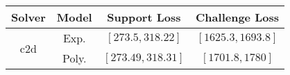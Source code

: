 \begin{tabular}{cc|c|c} 
\hline 
 Solver & Model & Support Loss  & Challenge Loss \tabularnewline\hline 
\hline 
\multirow{2}{*}{c2d} & Exp. & $\mathbf{\left[273.5,318.22\right]}$ & $\mathbf{\left[1625.3,1693.8\right]}$ \tabularnewline 
 & Poly. & $\left[273.49,318.31\right]$ & $\left[1701.8,1780\right]$ \tabularnewline 
\hline 
\end{tabular} 

